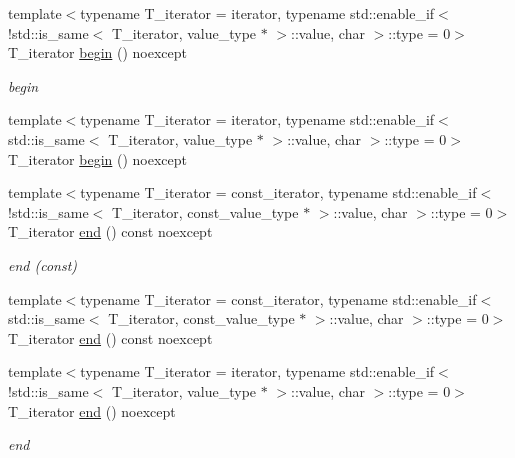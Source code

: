 \begin{DoxyCompactItemize}
\item 
{\footnotesize template$<$typename T\+\_\+iterator  = iterator, typename std\+::enable\+\_\+if$<$!std\+::is\+\_\+same$<$ T\+\_\+iterator, value\+\_\+type $\ast$ $>$\+::value, char $>$\+::type  = 0$>$ }\\T\+\_\+iterator \hyperlink{classIceBRG_1_1labeled__array__col__reference_ae62e4e4b5b8431a5b2c7e68b0e8e6231}{begin} () noexcept
\begin{DoxyCompactList}\small\item\em begin \end{DoxyCompactList}\item 
{\footnotesize template$<$typename T\+\_\+iterator  = iterator, typename std\+::enable\+\_\+if$<$ std\+::is\+\_\+same$<$ T\+\_\+iterator, value\+\_\+type $\ast$ $>$\+::value, char $>$\+::type  = 0$>$ }\\T\+\_\+iterator \hyperlink{classIceBRG_1_1labeled__array__col__reference_ae62e4e4b5b8431a5b2c7e68b0e8e6231}{begin} () noexcept
\item 
{\footnotesize template$<$typename T\+\_\+iterator  = const\+\_\+iterator, typename std\+::enable\+\_\+if$<$!std\+::is\+\_\+same$<$ T\+\_\+iterator, const\+\_\+value\+\_\+type $\ast$ $>$\+::value, char $>$\+::type  = 0$>$ }\\T\+\_\+iterator \hyperlink{classIceBRG_1_1labeled__array__col__reference_a2cbc0421b5e4ad3d14197cc44efcb5ea}{end} () const  noexcept
\begin{DoxyCompactList}\small\item\em end (const) \end{DoxyCompactList}\item 
{\footnotesize template$<$typename T\+\_\+iterator  = const\+\_\+iterator, typename std\+::enable\+\_\+if$<$ std\+::is\+\_\+same$<$ T\+\_\+iterator, const\+\_\+value\+\_\+type $\ast$ $>$\+::value, char $>$\+::type  = 0$>$ }\\T\+\_\+iterator \hyperlink{classIceBRG_1_1labeled__array__col__reference_a2cbc0421b5e4ad3d14197cc44efcb5ea}{end} () const  noexcept
\item 
{\footnotesize template$<$typename T\+\_\+iterator  = iterator, typename std\+::enable\+\_\+if$<$!std\+::is\+\_\+same$<$ T\+\_\+iterator, value\+\_\+type $\ast$ $>$\+::value, char $>$\+::type  = 0$>$ }\\T\+\_\+iterator \hyperlink{classIceBRG_1_1labeled__array__col__reference_a6a658c030fd15dc17e39542b80b78d4c}{end} () noexcept
\begin{DoxyCompactList}\small\item\em end \end{DoxyCompactList}\item 

\end{DoxyCompactItemize}

